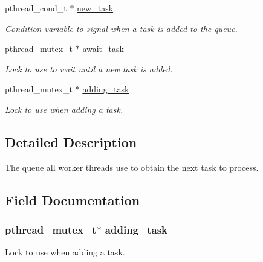 \begin{DoxyCompactItemize}
pthread\+\_\+cond\+\_\+t $\ast$ \hyperlink{struct_task___queue_a246f0c6d74730bab84d4cf40d95b4bcd}{new\+\_\+task}
\begin{DoxyCompactList}\small\item\em Condition variable to signal when a task is added to the queue. \end{DoxyCompactList}\item 
pthread\+\_\+mutex\+\_\+t $\ast$ \hyperlink{struct_task___queue_a9e5223ee99a4ba19be87c90bfd48663e}{await\+\_\+task}
\begin{DoxyCompactList}\small\item\em Lock to use to wait until a new task is added. \end{DoxyCompactList}\item 
pthread\+\_\+mutex\+\_\+t $\ast$ \hyperlink{struct_task___queue_a45cc6cc8a880eb1ea2cd3bbbfa5ddae5}{adding\+\_\+task}
\begin{DoxyCompactList}\small\item\em Lock to use when adding a task. \end{DoxyCompactList}\end{DoxyCompactItemize}


\subsection{Detailed Description}
The queue all worker threads use to obtain the next task to process. 

\subsection{Field Documentation}
\hypertarget{struct_task___queue_a45cc6cc8a880eb1ea2cd3bbbfa5ddae5}{}
\subsubsection[{adding\+\_\+task}]{\setlength{\rightskip}{0pt plus 5cm}pthread\+\_\+mutex\+\_\+t$\ast$ adding\+\_\+task}\label{struct_task___queue_a45cc6cc8a880eb1ea2cd3bbbfa5ddae5}


Lock to use when adding a task. 

\hypertarget{struct_task___queue_a9e5223ee99a4ba19be87c90bfd48663e}{}
